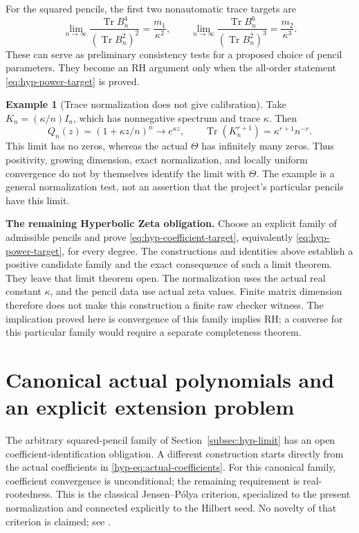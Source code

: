 \documentclass[11pt,a4paper]{article}
\numberwithin{equation}{section}
\theoremstyle{definition}
\newtheorem{example}[theorem]{Example}
\theoremstyle{remark}
\DeclareMathOperator{\Tr}{Tr}
\begin{document}
For the squared pencils, the first two nonautomatic trace targets are
\begin{equation}\label{eq:hyp-first-trace-targets}
\lim_{n\to\infty}
 \frac{\Tr B_n^4}{(\Tr B_n^2)^2}=\frac{m_1}{\kappa^2},
\qquad
\lim_{n\to\infty}
 \frac{\Tr B_n^6}{(\Tr B_n^2)^3}=\frac{m_2}{\kappa^3}.
\end{equation}
These can serve as preliminary consistency tests for a proposed choice
of pencil parameters. They become an RH argument only when the
all-order statement \eqref{eq:hyp-power-target} is proved.

\begin{example}[Trace normalization does not give calibration]
Take $K_n=(\kappa/n)I_n$, which has nonnegative spectrum and trace
$\kappa$. Then
\[
Q_n(z)=(1+\kappa z/n)^n\longrightarrow e^{\kappa z},\qquad
\Tr(K_n^{r+1})=\kappa^{r+1}n^{-r}.
\]
This limit has no zeros, whereas the actual $\Theta$ has infinitely
many zeros. Thus positivity, growing dimension, exact normalization,
and locally uniform convergence do not by themselves identify the
limit with $\Theta$. The example is a general normalization test,
not an assertion that the project's particular pencils have this limit.
\end{example}

\begin{scopebox}
\small\textbf{The remaining Hyperbolic Zeta obligation.}
Choose an explicit family of admissible pencils and prove
\eqref{eq:hyp-coefficient-target}, equivalently
\eqref{eq:hyp-power-target}, for every degree. The constructions and
identities above establish a positive candidate family and the exact
consequence of such a limit theorem. They leave that limit theorem open.
The normalization uses the actual real constant $\kappa$, and the
pencil data use actual zeta values. Finite matrix dimension therefore
does not make this construction a finite raw checker witness.
The implication proved here is convergence of this family implies RH;
a converse for this particular family would require a separate
completeness theorem.
\end{scopebox}



\section[Canonical actual polynomials]{Canonical actual polynomials and an explicit extension problem}
\label{sec:canonical-polynomials}

The arbitrary squared-pencil family of Section~\ref{subsec:hyp-limit}
has an open coefficient-identification obligation. A different construction
starts directly from the actual coefficients in
\eqref{hyp-eq:actual-coefficients}. For this canonical family, coefficient
convergence is unconditional; the remaining requirement is real-rootedness.
This is the classical Jensen--P\'olya criterion, specialized to the present
normalization and connected explicitly to the Hilbert seed. No novelty of
that criterion is claimed; see \cite{gorz-jensen,gorttw-jensen}.
\end{document}

